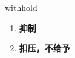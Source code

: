 
\begin{frame}
{\huge withhold}
\begin{center}
\begin{enumerate}\Large
  \item \textbf{抑制}
  \item \textbf{扣压，不给予}
\end{enumerate}
\end{center}
\end{frame}
